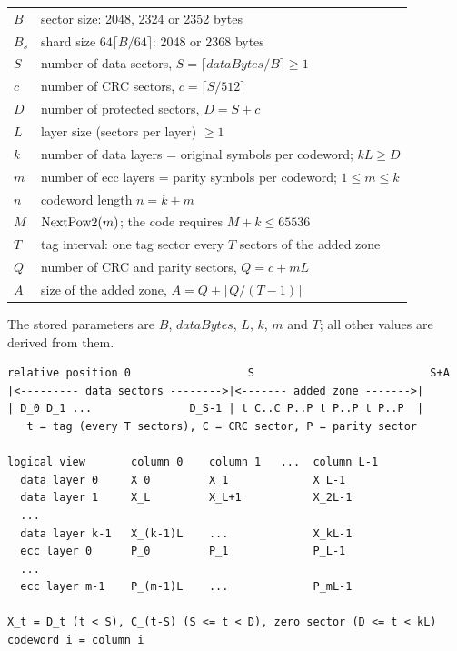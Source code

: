 \medskip
\begin{tabular}{|l|p{12.5cm}|}
\hline
$B$ & sector size: 2048, 2324 or 2352 bytes \\
$B_s$ & shard size $64 \lceil B/64 \rceil$: 2048 or 2368 bytes \\
$S$ & number of data sectors, $S = \lceil dataBytes / B \rceil \ge 1$ \\
$c$ & number of CRC sectors, $c = \lceil S / 512 \rceil$ \\
$D$ & number of protected sectors, $D = S + c$ \\
$L$ & layer size (sectors per layer) $\ge 1$ \\
$k$ & number of data layers = original symbols per codeword; $kL \ge D$ \\
$m$ & number of ecc layers = parity symbols per codeword; $1 \le m \le k$ \\
$n$ & codeword length $n = k + m$ \\
$M$ & ${\rm NextPow2}(m)$; the code requires $M + k \le 65536$ \\
$T$ & tag interval: one tag sector every $T$ sectors of the added zone \\
$Q$ & number of CRC and parity sectors, $Q = c + mL$ \\
$A$ & size of the added zone, $A = Q + \lceil Q / (T-1) \rceil$ \\
\hline
\end{tabular}
\medskip

The stored parameters are $B$, $dataBytes$, $L$, $k$, $m$ and $T$; all other
values are derived from them.

{\footnotesize
\begin{verbatim}
relative position 0                  S                           S+A
|<--------- data sectors -------->|<------- added zone ------->|
| D_0 D_1 ...               D_S-1 | t C..C P..P t P..P t P..P  |
   t = tag (every T sectors), C = CRC sector, P = parity sector

logical view       column 0    column 1   ...  column L-1
  data layer 0     X_0         X_1             X_L-1
  data layer 1     X_L         X_L+1           X_2L-1
  ...
  data layer k-1   X_(k-1)L    ...             X_kL-1
  ecc layer 0      P_0         P_1             P_L-1
  ...
  ecc layer m-1    P_(m-1)L    ...             P_mL-1

X_t = D_t (t < S), C_(t-S) (S <= t < D), zero sector (D <= t < kL)
codeword i = column i
\end{verbatim}
}

